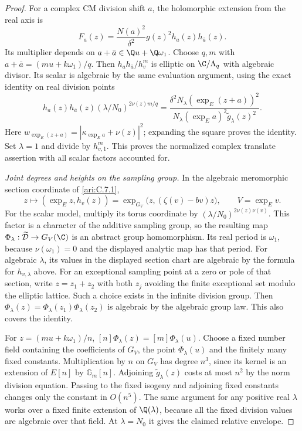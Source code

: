 \begin{proof}
For a complex CM division shift $a$, the holomorphic extension
from the real axis is
\[
 F_a(z)=\frac{N(a)^2}{\delta^2}g(z)^2h_a(z)h_{\bar a}(z).
\]
Its multiplier depends on $a+\bar a\in\Q u+\Q\omega_1$.
Choose $q,m$ with $a+\bar a=(mu+k\omega_1)/q$.
Then $h_ah_{\bar a}/h_v^m$ is elliptic on $\C/\Lambda_q$
with algebraic divisor. Its scalar is algebraic by the same
evaluation argument, using the exact identity on real division
points
\[
 h_a(z)h_{\bar a}(z)(\lambda/N_0)^{2\nu(z)m/q}
 =\frac{\delta^2N_\lambda(\exp_E(z+a))^2}
        {N_\lambda(\exp_Ea)^2\widetilde g_\lambda(z)^2}.
\]
Here $w_{\exp_E(z+a)}=|\kappa_{\exp_Ea}+\nu(z)|^2$;
expanding the square proves the identity. Set $\lambda=1$
and divide by $h_{v,1}^m$. This proves the normalized complex
translate assertion with all scalar factors accounted for.

\emph{Joint degrees and heights on the sampling group.}
In the algebraic meromorphic section coordinate of
\ref{ari:C.7.1},
\[
 z\longmapsto(\exp_Ez,h_v(z))
   =\exp_{G_V}\bigl(z,(\zeta(v)-bv)z\bigr),\qquad
 V=\exp_Ev.
\]
For the scalar model, multiply its torus coordinate by
$(\lambda/N_0)^{2\nu(z)\nu(v)}$. This factor is a character
of the additive sampling group, so the resulting map
$\Phi_\lambda:\widetilde{\mathcal D}\to G_V(\C)$ is an
abstract group homomorphism. Its real period is $\omega_1$,
because $\nu(\omega_1)=0$ and the displayed analytic map
has that period. For algebraic $\lambda$, its values in the displayed section
chart are algebraic by the formula for $h_{v,\lambda}$ above.
For an exceptional sampling point at a zero or pole of that
section, write $z=z_1+z_2$ with both $z_j$ avoiding the finite
exceptional set modulo the elliptic lattice. Such a choice exists
in the infinite division group. Then
$\Phi_\lambda(z)=\Phi_\lambda(z_1)\Phi_\lambda(z_2)$ is
algebraic by the algebraic group law. This also covers the identity.

For $z=(mu+k\omega_1)/n$,
$[n]\Phi_\lambda(z)=[m]\Phi_\lambda(u)$.
Choose a fixed number field containing the coefficients of
$G_V$, the point $\Phi_\lambda(u)$ and the finitely many
fixed constants. Multiplication by $n$ on $G_V$ has degree
$n^3$, since its kernel is an extension of $E[n]$ by
$\mathbb G_m[n]$. Adjoining $\widetilde g_\lambda(z)$ costs
at most $n^2$ by the norm division equation. Passing to the
fixed isogeny and adjoining fixed constants changes only the
constant in $O(n^5)$. The same argument for any positive real
$\lambda$ works over a fixed finite extension of $\Q(\lambda)$,
because all the fixed division values are algebraic over that
field. At $\lambda=N_0$ it gives the claimed relative envelope.


\end{proof}
